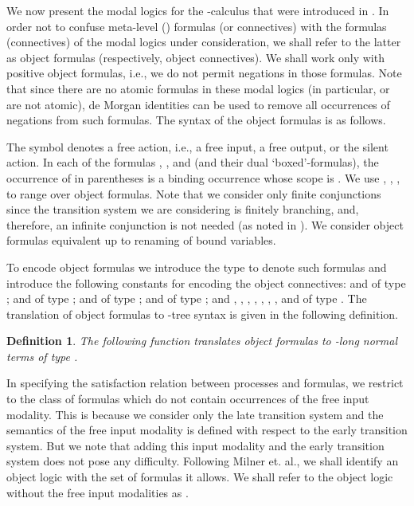 \documentclass{acmtrans2m}
\newenvironment{definition}{\begin{define} \rm}{\end{define}}
\newtheorem{define}[theorem]{Definition}
\begin{document}
We now present the modal logics for the -calculus that were introduced
in \cite{milner93tcs}.  
In order not to confuse meta-level () formulas (or connectives) with
the formulas (connectives) of the modal logics under consideration, we shall
refer to the latter as object formulas (respectively, object connectives). 
We shall work only with positive object formulas, i.e., we do not permit
negations in those formulas. Note that since there are no atomic formulas
in these modal logics (in particular,  or  are not atomic),
de Morgan identities can be used to remove all occurrences of
negations from such formulas.
The syntax of the object formulas is as follows. 

The symbol  denotes a free action, i.e., a free input, a free
output, or the silent action.
In each of the formulas 
, ,  and
 (and their dual `boxed'-formulas), the occurrence of  in parentheses is
a binding occurrence whose scope is .
We use , , ,  to range over object formulas.
Note that we consider only finite conjunctions since the transition system
we are considering is finitely branching, and, therefore, an infinite
conjunction is not needed (as noted in \cite{milner93tcs}).
We consider object formulas equivalent up to renaming of bound variables. 

To encode object formulas we introduce the 
type  to denote such formulas and introduce the
following constants for encoding the object connectives:
 and  of type ; 
 and  of type ; 
 and 
of type ; 
 and  of type ; and
,
,
, 
, 
, 
, 
, and
 of type .
The translation of object formulas to -tree syntax is
given in the following definition.

\begin{definition}
The following function  translates object formulas 
to -long normal terms of type . 

\end{definition}

In specifying the satisfaction relation  between processes and
formulas, we restrict to the class of formulas which do not contain
occurrences of the free input modality. This is because we consider only the late transition system
and the semantics of the free input modality is defined with respect to the early
transition system.
But we note that adding this input modality and the early transition system 
does not pose any difficulty. Following Milner et. al., we shall identify
an object logic with the set of formulas it allows. We shall refer
to the object logic without the free input modalities as . 
\end{document}
